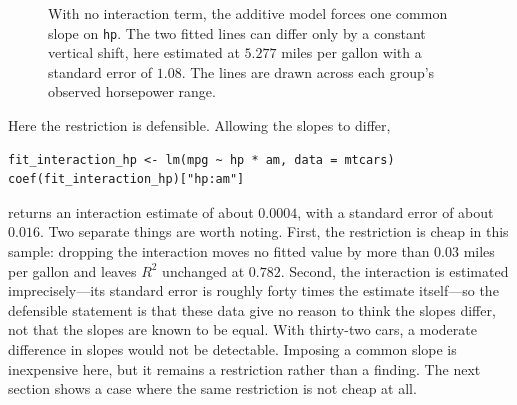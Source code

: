 \documentclass[11pt]{report}
\begin{document}
\begin{figure}[H]
\centering
{}
\caption{With no interaction term, the additive model forces one common slope on \texttt{hp}. The two fitted lines can differ only by a constant vertical shift, here estimated at \(5.277\) miles per gallon with a standard error of \(1.08\). The lines are drawn across each group's observed horsepower range.}
\label{fig:additive_mtcars}
\end{figure}

Here the restriction is defensible. Allowing the slopes to differ,

\begin{lstlisting}
fit_interaction_hp <- lm(mpg ~ hp * am, data = mtcars)
coef(fit_interaction_hp)["hp:am"]
\end{lstlisting}

returns an interaction estimate of about \(0.0004\), with a standard error of about \(0.016\). Two separate things are worth noting. First, the restriction is cheap in this sample: dropping the interaction moves no fitted value by more than \(0.03\) miles per gallon and leaves \(R^2\) unchanged at \(0.782\). Second, the interaction is estimated imprecisely---its standard error is roughly forty times the estimate itself---so the defensible statement is that these data give no reason to think the slopes differ, not that the slopes are known to be equal. With thirty-two cars, a moderate difference in slopes would not be detectable. Imposing a common slope is inexpensive here, but it remains a restriction rather than a finding. The next section shows a case where the same restriction is not cheap at all.
\end{document}
